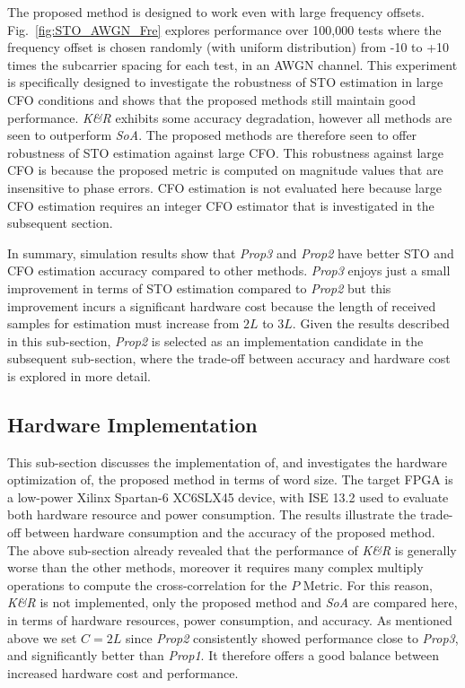 The proposed method is designed to work even with large frequency offsets.
Fig.~\ref{fig:STO_AWGN_Fre} explores performance over 100,000 tests where the frequency offset is chosen randomly (with uniform distribution) from -10 to +10 times the subcarrier spacing for each test, in an AWGN channel.
This experiment is specifically designed to investigate the robustness of STO estimation in large CFO conditions and shows that the proposed methods still maintain good performance. \textit{K\&R} exhibits some accuracy degradation, however all methods are seen to outperform \textit{SoA}. The proposed methods are therefore seen to offer robustness of STO estimation against large CFO.
This robustness against large CFO is because the proposed metric is computed on magnitude values that are insensitive to phase errors.
CFO estimation is not evaluated here because large CFO estimation requires an integer CFO estimator that is investigated in the subsequent section.

In summary, simulation results show that \textit{Prop3} and \textit{Prop2} have better STO and CFO estimation accuracy compared to other methods. 
\textit{Prop3} enjoys just a small improvement in terms of STO estimation compared to \textit{Prop2} but this improvement incurs a significant hardware cost because the length of received samples for estimation must increase from $2L$ to $3L$. 
Given the results described in this sub-section, \textit{Prop2} is selected as an implementation candidate in the subsequent sub-section, where the trade-off between accuracy and hardware cost is explored in more detail.

\subsection{Hardware Implementation}
This sub-section discusses the implementation of, and investigates the hardware optimization of, the proposed method in terms of word size. The target FPGA is a low-power Xilinx Spartan-6 XC6SLX45 device, with ISE 13.2 used to evaluate both hardware resource and power consumption.
The results illustrate the trade-off between hardware consumption and the accuracy of the proposed method.
The above sub-section already revealed that the performance of \textit{K\&R} is generally worse than the other methods, moreover it requires many complex multiply operations to compute the cross-correlation for the $P$ Metric. For this reason, \textit{K\&R} is not implemented, only the proposed method and \textit{SoA} are compared here, in terms of hardware resources, power consumption, and accuracy. As mentioned above we set  $C=2L$ since \textit{Prop2} consistently showed performance close to \textit{Prop3}, and significantly better than \textit{Prop1}. It  therefore offers a good balance between increased hardware cost and performance.

